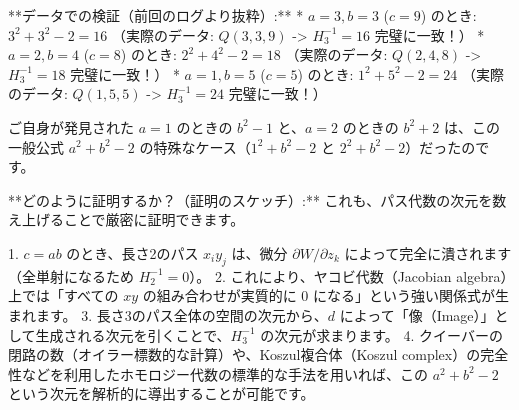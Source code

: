 \documentclass[uplatex,12pt,dvipdfmx]{jsarticle}
\theoremstyle{definition}
\numberwithin{equation}{section}
\begin{document}
**データでの検証（前回のログより抜粋）:**
* $a=3, b=3$ ($c=9$) のとき: $3^2 + 3^2 - 2 = 16$
  （実際のデータ: $Q(3, 3, 9)$ -> $H^{-1}_3 = 16$ 完璧に一致！）
* $a=2, b=4$ ($c=8$) のとき: $2^2 + 4^2 - 2 = 18$
  （実際のデータ: $Q(2, 4, 8)$ -> $H^{-1}_3 = 18$ 完璧に一致！）
* $a=1, b=5$ ($c=5$) のとき: $1^2 + 5^2 - 2 = 24$
  （実際のデータ: $Q(1, 5, 5)$ -> $H^{-1}_3 = 24$ 完璧に一致！）

ご自身が発見された $a=1$ のときの $b^2 - 1$ と、$a=2$ のときの $b^2 + 2$ は、この一般公式 $a^2 + b^2 - 2$ の特殊なケース（$1^2 + b^2 - 2$ と $2^2 + b^2 - 2$）だったのです。

**どのように証明するか？（証明のスケッチ）:**
これも、パス代数の次元を数え上げることで厳密に証明できます。

1. $c = ab$ のとき、長さ2のパス $x_i y_j$ は、微分 $\partial W / \partial z_k$ によって完全に潰されます（全単射になるため $H^{-1}_2 = 0$）。
2. これにより、ヤコビ代数（Jacobian algebra）上では「すべての $xy$ の組み合わせが実質的に 0 になる」という強い関係式が生まれます。
3. 長さ3のパス全体の空間の次元から、$d$ によって「像（Image）」として生成される次元を引くことで、$H^{-1}_3$ の次元が求まります。
4. クイーバーの閉路の数（オイラー標数的な計算）や、Koszul複合体（Koszul complex）の完全性などを利用したホモロジー代数の標準的な手法を用いれば、この $a^2 + b^2 - 2$ という次元を解析的に導出することが可能です。




\end{document}
